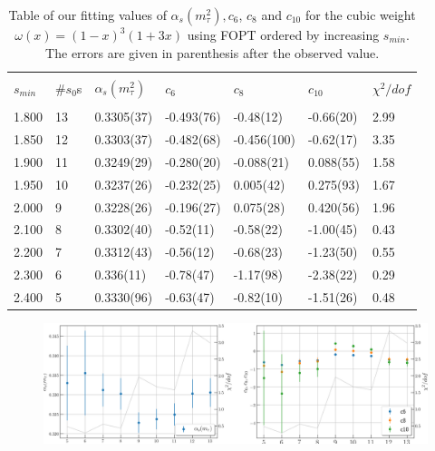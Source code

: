 \documentclass[../../index.tex]{subfiles}
\begin{document}
\begin{table}[H]
  \centering
  \begin{tabular}{lllllll}
    \toprule \\
    $s_{min}$ & \#$s_0$s & $\alpha_s(m_\tau^2)$ & $c_6$ & $c_8$ & $c_{10}$ & $\chi^2/dof$  \\
    \hline \\
    1.800 & 13 & 0.3305(37) & -0.493(76) & -0.48(12) & -0.66(20) & 2.99 \\
    1.850 & 12 & 0.3303(37) & -0.482(68) & -0.456(100) & -0.62(17) & 3.35 \\
    1.900 & 11 & 0.3249(29) & -0.280(20) & -0.088(21) & 0.088(55) & 1.58 \\
    1.950 & 10 & 0.3237(26) & -0.232(25) & 0.005(42) & 0.275(93) & 1.67 \\
    2.000 & 9 & 0.3228(26) & -0.196(27) & 0.075(28) & 0.420(56) & 1.96 \\
    2.100 & 8 & 0.3302(40) & -0.52(11) & -0.58(22) & -1.00(45) & 0.43 \\
    2.200 & 7 & 0.3312(43) & -0.56(12) & -0.68(23) & -1.23(50) & 0.55 \\
    2.300 & 6 & 0.336(11) & -0.78(47) & -1.17(98) & -2.38(22) & 0.29 \\
    2.400 & 5 & 0.3330(96) & -0.63(47) & -0.82(10) & -1.51(26) & 0.48 \\
    \bottomrule
  \end{tabular}
  \caption{Table of our fitting values of $\alpha_s(m_\tau^2), c_6$, $c_8$ and
    $c_{10}$ for the cubic weight $\omega(x)=(1-x)^3(1+3x)$ using FOPT ordered
    by increasing $s_{min}$. The errors are given in parenthesis after the observed value.}
  \label{table:fitWCubicAlD6D8D10}
\end{table}
\begin{figure}[H]
  \centering
  \includegraphics[width=\textwidth]{./images/fitWCubeAlD6D8D10.png}
  \label{fig:fitWCubeAlpha}
\end{figure}
\end{document}
